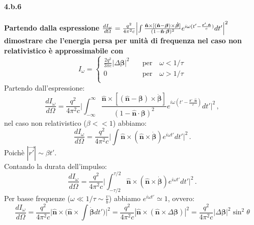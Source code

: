 \documentclass[twoside]{article}
\begin{document}
\paragraph{4.b.6}\textbf{Partendo dalla espressione $\frac{dI_\omega}{d\Omega}=\frac{q^2}{4\pi^2 c} \Bigl| \int \frac{\mathbf{\hat{n}}\times[(\mathbf{\hat{n}}-\bm{\beta})\times\bm{\dot{\beta}} ]}{(1-\mathbf{\hat{n}}\cdot\bm{\beta})^2} e^{i\omega ( t'-\frac{\mathbf{r'}\cdot\mathbf{\hat{n}}}{c} ) } dt' \Bigr|^2$ dimostrare che l'energia persa per unità di frequenza nel caso non relativistico è approssimabile con 
\begin{equation*}
I_\omega=
\begin{cases}
\frac{2q^2}{3\pi c} |\Delta \bm{\beta}|^2\quad &\text{per} \quad \omega<1/\tau \\
0 \quad &\text{per} \quad \omega>1/\tau  \\
\end{cases}
\end{equation*}}
Partendo dall'espressione:
\begin{equation*}
\frac{dI_\omega}{d\Omega}=\frac{q^2}{4\pi^2 c} \biggl| \int_{-\infty}^\infty \frac{\mathbf{\hat{n}}\times[(\mathbf{\hat{n}}-\bm{\beta})\times\bm{\dot{\beta}} ]}{(1-\mathbf{\hat{n}}\cdot\bm{\beta})^2} e^{i\omega ( t'-\frac{\mathbf{r'}\cdot\mathbf{\hat{n}}}{c} ) } dt' \biggr|^2 \, ,
\end{equation*}
nel caso non relativistico ($\beta<<1$) abbiamo:
\begin{equation*}
\frac{dI_\omega}{d\Omega}=\frac{q^2}{4\pi^2 c} \biggl| \int \mathbf{\hat{n}}\times(\mathbf{\hat{n}}\times\bm{\dot{\beta}}) e^{i\omega t'} dt' \biggr|^2 \, .
\end{equation*}
Poichè $|\vec{r'}|\sim \beta t'$.\\
Contando la durata dell'impulso:
\begin{equation*}
\frac{dI_\omega}{d\Omega}=\frac{q^2}{4\pi^2 c} \biggl| \int_{-\tau/2}^{\tau/2} \mathbf{\hat{n}}\times(\mathbf{\hat{n}}\times\bm{\dot{\beta}}) e^{i\omega t'} dt' \biggr|^2 \, .
\end{equation*}
Per basse frequenze ($\omega\ll1/\tau\sim \frac{v}{b}$) abbiamo $e^{i\omega t'} \simeq 1$, ovvero:
\begin{equation}
\frac{dI_\omega}{d\Omega}=\frac{q^2}{4\pi^2 c} \biggl| \mathbf{\hat{n}}\times \biggl( \mathbf{\hat{n}}\times \int \bm{\dot{\beta}}dt' \biggr) \biggr|^2=\frac{q^2}{4\pi^2 c} |\mathbf{\hat{n}}\times( \mathbf{\hat{n}}\times \Delta\bm{\beta})|^2=\frac{q^2}{4\pi^2 c} |\Delta\bm{\beta}|^2 \sin^2\theta \end{equation}
\end{document}
